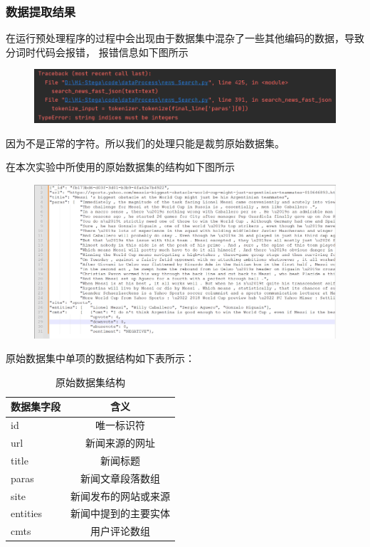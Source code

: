\documentclass[a4paper,11pt,UTF8]{ctexart}
\newcommand{\bottomcaption}{%
\setlength{\abovecaptionskip}{6pt}%
\setlength{\belowcaptionskip}{6pt}%
\caption}
\newcommand{\xiaowuhao}{\fontsize{9pt}{\baselineskip}\selectfont}   %
\begin{document}
      \subsubsection{数据提取结果}
        在运行预处理程序的过程中会出现由于数据集中混杂了一些其他编码的数据，导致分词时代码会报错，
        报错信息如下图所示
        \begin{figure}[H]
          \centering
          \includegraphics[width=13cm]{预处理报错.png}
          \bottomcaption{\xiaowuhao{预处理过程报错信息}}
        \end{figure}
        因为不是正常的字符。所以我们的处理只能是裁剪原始数据集。\par
        在本次实验中所使用的原始数据集的结构如下图所示
        \begin{figure}[H]
            \centering
            \includegraphics[width=13cm]{原始数据集.png}
            \bottomcaption{\xiaowuhao{原始数据集结构}}
        \end{figure}

        原始数据集中单项的数据结构如下表所示：
        \begin{table}[H]
            \caption{原始数据集结构}\label{tab1}
              \centering
            \begin{tabular*}{0.75\textwidth}{@{\extracolsep{\fill}}lc}
                \toprule
                数据集字段           &含义                                \\
                \midrule
                id           &唯一标识符\\
                url         &新闻来源的网址\\
                title       & 新闻标题\\
                paras       &新闻文章段落数组\\
                site        &新闻发布的网站或来源\\
                entities    &新闻中提到的主要实体\\
                cmts        &用户评论数组\\
                \bottomrule
            \end{tabular*}
        \end{table}        
\end{document}
